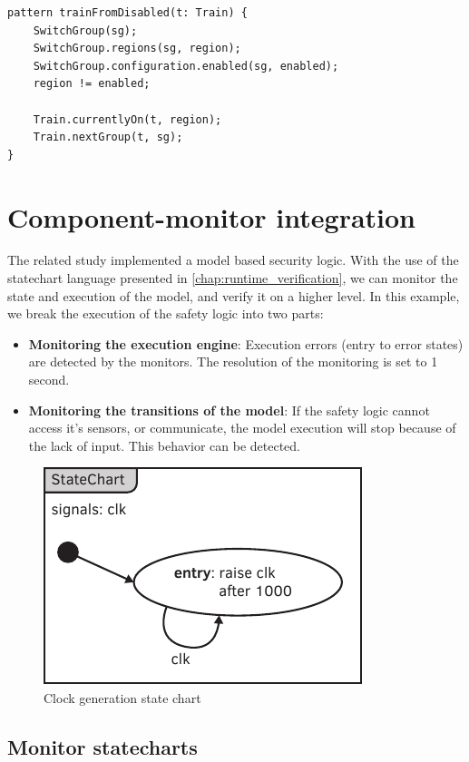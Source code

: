 \begin{lstlisting}[caption={Collision detection},label=lst:case_study:train_at_next_powerable]
pattern trainFromDisabled(t: Train) {
	SwitchGroup(sg);
	SwitchGroup.regions(sg, region);
	SwitchGroup.configuration.enabled(sg, enabled);
	region != enabled;
	
	Train.currentlyOn(t, region);
	Train.nextGroup(t, sg);
}
\end{lstlisting}

\section{Component-monitor integration}

The related study \citep{tdk2014} implemented a model based security logic. With the use of the statechart language presented in \vref{chap:runtime_verification}, we can monitor the state and execution of the model, and verify it on a higher level. In this example, we break the execution of the safety logic into two parts:
\begin{itemize}
	\item \textbf{Monitoring the execution engine}: Execution errors (entry to error states) are detected by the monitors. The resolution of the monitoring is set to 1 second.
	\item \textbf{Monitoring the transitions of the model}: If the safety logic cannot access it's sensors, or communicate, the model execution will stop because of the lack of input. This behavior can be detected.
\end{itemize}

\begin{figure}[h]
	\centering
	\includegraphics[width=0.3\linewidth]{include/figures/chapter_6/statecharts/clock}
	\caption{Clock generation state chart}
	\label{fig:case_study:clockgen}
\end{figure}

\subsection{Monitor statecharts}
\label{sec:case_study:mon_sc}

